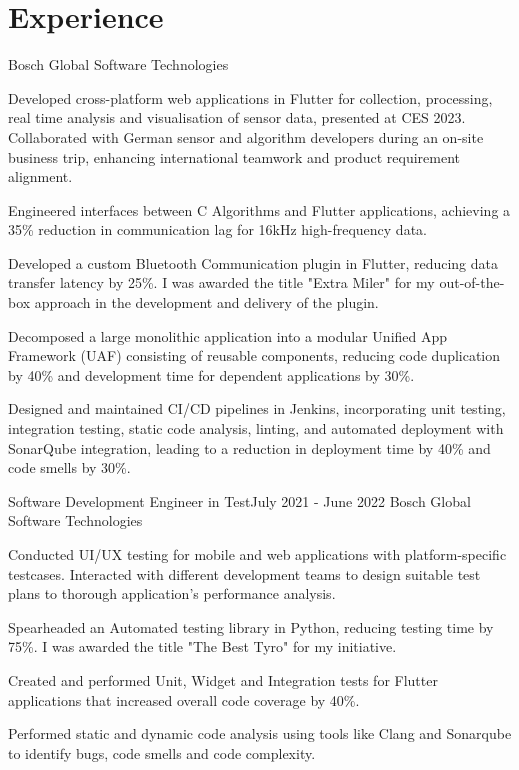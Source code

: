 \vspace{-5pt}
\section{Experience}
\resumeSubHeadingListStart
    {Bosch Global Software Technologies}{}
    \resumeItemListStart
          {
\item Developed cross-platform web applications in Flutter for collection, processing, real time analysis and visualisation of sensor data, presented at CES 2023. Collaborated with German sensor and algorithm developers during an on-site business trip, enhancing international teamwork and product requirement alignment.
  \item Engineered interfaces between C Algorithms and Flutter applications, achieving a 35\% reduction in communication lag for 16kHz high-frequency data.
  \item Developed a custom Bluetooth Communication plugin in Flutter, reducing data transfer latency by 25\%. I was awarded the title "Extra Miler" for my out-of-the-box approach in the development and delivery of the plugin.
  \item  Decomposed a large monolithic application into a modular Unified App Framework (UAF) consisting of reusable components, reducing code duplication by 40\% and development time for dependent applications by 30\%. 
   \item Designed and maintained CI/CD pipelines in Jenkins, incorporating unit testing, integration testing, static code analysis, linting, and automated deployment with SonarQube integration, leading to a reduction in deployment time by 40\% and code smells by 30\%.

}      \resumeItemListEnd
\vspace{-1pt}

    \resumeSubheading
		{Software Development Engineer in Test}{July 2021 - June 2022}
		{Bosch Global Software Technologies}{}
		\resumeItemListStart
        \item Conducted UI/UX testing for mobile and web applications with platform-specific testcases. Interacted with different development teams to design suitable test plans to thorough application's performance analysis.
        \item Spearheaded an Automated testing library in Python, reducing testing time by 75\%. I was awarded the title "The Best Tyro" for my initiative.
        \item Created and performed Unit, Widget and Integration tests for Flutter applications that increased overall code coverage by 40\%.
        \item Performed static and dynamic code analysis using tools like Clang and Sonarqube to identify bugs, code smells and code complexity.
	\resumeItemListEnd
    \vspace{-1pt}


